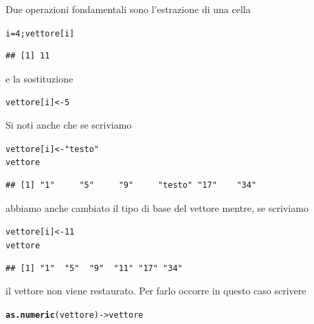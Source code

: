 \documentclass[onecolumn,11pt]{book}\usepackage[]{graphicx}\usepackage[]{color}
\makeatletter
\newcommand{\hlnum}[1]{\textcolor[rgb]{0.686,0.059,0.569}{#1}}%
\newcommand{\hlstr}[1]{\textcolor[rgb]{0.192,0.494,0.8}{#1}}%
\newcommand{\hlstd}[1]{\textcolor[rgb]{0.345,0.345,0.345}{#1}}%
\newcommand{\hlkwb}[1]{\textcolor[rgb]{0.69,0.353,0.396}{#1}}%
\newcommand{\hlkwd}[1]{\textcolor[rgb]{0.737,0.353,0.396}{\textbf{#1}}}%
\newenvironment{kframe}{%
 \def\at@end@of@kframe{}%
 \ifinner\ifhmode%
  \def\at@end@of@kframe{\end{minipage}}%
  \begin{minipage}{\columnwidth}%
 \fi\fi%
 \def\FrameCommand##1{\hskip\@totalleftmargin \hskip-\fboxsep
 \colorbox{shadecolor}{##1}\hskip-\fboxsep
     \hskip-\linewidth \hskip-\@totalleftmargin \hskip\columnwidth}%
 \MakeFramed {\advance\hsize-\width
   \@totalleftmargin\z@ \linewidth\hsize
   \@setminipage}}%
 {\par\unskip\endMakeFramed%
 \at@end@of@kframe}
\newenvironment{knitrout}{}{} %
\makeatother
\begin{document}
Due operazioni fondamentali sono l'estrazione di una cella
\begin{knitrout}
\color{fgcolor}\begin{kframe}
\begin{alltt}
\hlstd{i}\hlkwb{=}\hlnum{4}\hlstd{;vettore[i]}
\end{alltt}
\begin{verbatim}
## [1] 11
\end{verbatim}
\end{kframe}
\end{knitrout}
e la sostituzione
\begin{knitrout}
\color{fgcolor}\begin{kframe}
\begin{alltt}
\hlstd{vettore[i]}\hlkwb{<-}\hlnum{5}
\end{alltt}
\end{kframe}
\end{knitrout}
Si noti anche che se scriviamo
\begin{knitrout}
\color{fgcolor}\begin{kframe}
\begin{alltt}
\hlstd{vettore[i]}\hlkwb{<-}\hlstr{"testo"}
\hlstd{vettore}
\end{alltt}
\begin{verbatim}
## [1] "1"     "5"     "9"     "testo" "17"    "34"
\end{verbatim}
\end{kframe}
\end{knitrout}
abbiamo anche cambiato il tipo di base del vettore mentre, se scriviamo
\begin{knitrout}
\color{fgcolor}\begin{kframe}
\begin{alltt}
\hlstd{vettore[i]}\hlkwb{<-}\hlnum{11}
\hlstd{vettore}
\end{alltt}
\begin{verbatim}
## [1] "1"  "5"  "9"  "11" "17" "34"
\end{verbatim}
\end{kframe}
\end{knitrout}
il vettore non viene restaurato. Per farlo occorre in questo caso scrivere
\begin{knitrout}
\color{fgcolor}\begin{kframe}
\begin{alltt}
\hlkwd{as.numeric}\hlstd{(vettore)}\hlkwb{->}\hlstd{vettore}
\end{alltt}
\end{kframe}
\end{knitrout}
\end{document}
